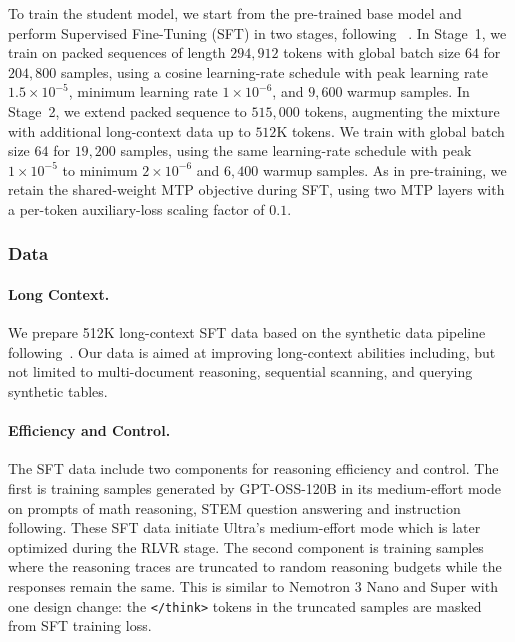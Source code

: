 To train the student model, we start from the pre-trained base model and perform Supervised Fine-Tuning (SFT) in two stages, following \supermodel~\citep{nvidia2026nemotron3superopen}. In Stage~1, we train on packed sequences of length $294{,}912$ tokens with global batch size $64$ for $204{,}800$ samples, using a cosine learning-rate schedule with peak learning rate $1.5 \times 10^{-5}$, minimum learning rate $1 \times 10^{-6}$, and $9{,}600$ warmup samples. In Stage~2, we extend packed sequence to $515{,}000$ tokens, augmenting the mixture with additional long-context data up to $512$K tokens. We train with global batch size $64$ for $19{,}200$ samples, using the same learning-rate schedule with peak $1 \times 10^{-5}$ to minimum $2 \times 10^{-6}$ and $6{,}400$ warmup samples. 
As in pre-training, we retain the shared-weight MTP objective during SFT, using two MTP layers with a per-token auxiliary-loss scaling factor of $0.1$.

\subsubsection{Data}
\paragraph{Long Context.}
We prepare 512K long-context SFT data based on the synthetic data pipeline following~\citep{nvidia2026nemotron3superopen}. 
Our data is aimed at improving long-context abilities including, but not limited to multi-document reasoning, sequential scanning, and querying synthetic tables.
\paragraph{Efficiency and Control.}
The SFT data include two components for reasoning efficiency and control. The first is training samples
generated by GPT-OSS-120B in its medium-effort mode on prompts of math reasoning, STEM question answering and instruction following. These SFT data initiate Ultra's medium-effort mode which is later optimized during the RLVR stage. The second component is training samples where the reasoning traces are truncated to random reasoning budgets while the responses remain the same. This is similar to Nemotron 3 Nano and Super with one design change: the \texttt{</think>} tokens in the truncated samples are masked from SFT training loss.


